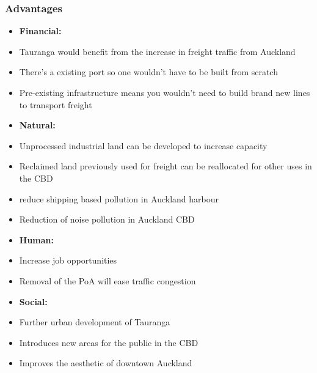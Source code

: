 \begin{multicols}{2}
   \subsubsection*{Advantages}
    \begin{itemize}[noitemsep]
        \item []\textbf{Financial: }
        \item{Tauranga would benefit from the increase in freight traffic from Auckland}
        \item{There's a existing port so one wouldn't have to be built from scratch}
        \item{Pre-existing infrastructure means you wouldn't need to build brand new lines to transport freight}
        \item []\textbf{Natural: }
        \item{Unprocessed industrial land can be developed to increase capacity}
        \item{Reclaimed land previously used for freight can be reallocated for other uses in the CBD}
        \item{reduce shipping based pollution in Auckland harbour}
        \item{Reduction of noise pollution in Auckland CBD}
        \item []\textbf{Human: }
        \item{Increase job opportunities}
        \item{Removal of the PoA will ease traffic congestion}
        \item []\textbf{Social: }
        \item{Further urban development of Tauranga}
        \item{Introduces new areas for the public in the CBD}
        \item{Improves the aesthetic of downtown Auckland}
    \end{itemize}

\end{multicols}
